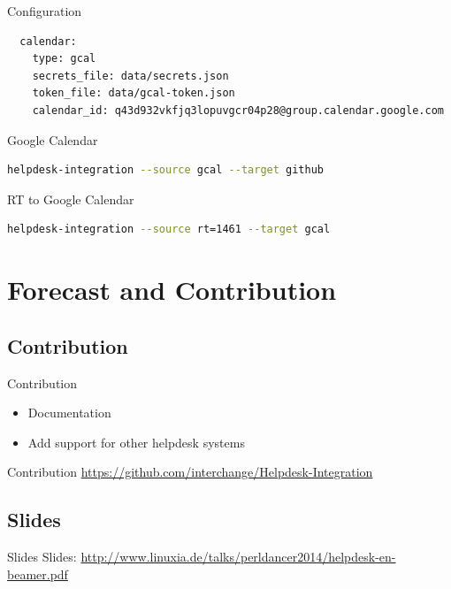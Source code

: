 \begin{frame}[fragile]{Configuration}
\begin{lstlisting}
  calendar:
    type: gcal
    secrets_file: data/secrets.json
    token_file: data/gcal-token.json
    calendar_id: q43d932vkfjq3lopuvgcr04p28@group.calendar.google.com
\end{lstlisting}
\end{frame}

\begin{frame}[fragile]{Google Calendar}
\begin{lstlisting}[language=bash]
helpdesk-integration --source gcal --target github
\end{lstlisting}
\end{frame}

\begin{frame}[fragile]{RT to Google Calendar}
\begin{lstlisting}[language=bash]
helpdesk-integration --source rt=1461 --target gcal
\end{lstlisting}
\end{frame}

\section{Forecast and Contribution}

\subsection{Contribution}
\begin{frame}{Contribution}
\begin{itemize}
\item Documentation
\item Add support for other helpdesk systems
\end{itemize}
\end{frame}

\begin{frame}{Contribution}
\url{https://github.com/interchange/Helpdesk-Integration}
\end{frame}

\subsection{Slides}

\begin{frame}{Slides}
Slides:
\url{http://www.linuxia.de/talks/perldancer2014/helpdesk-en-beamer.pdf}
\end{frame}



